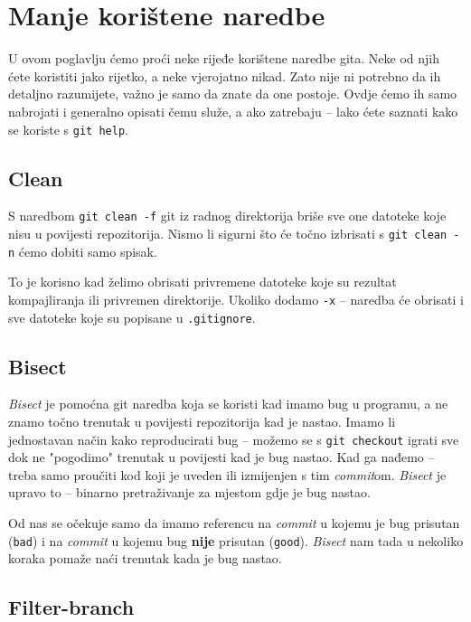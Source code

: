 \chapter*{Manje korištene naredbe}

U ovom poglavlju ćemo proći neke rijeđe korištene naredbe gita.
Neke od njih ćete koristiti jako rijetko, a neke vjerojatno nikad.
Zato nije ni potrebno da ih detaljno razumijete, važno je samo da znate da one postoje. 
Ovdje ćemo ih samo nabrojati i generalno opisati čemu služe, a ako zatrebaju -- lako ćete saznati kako se koriste s \verb+git help+.

\section*{Clean}

S naredbom \verb+git clean -f+ git iz radnog direktorija briše sve one datoteke koje nisu u povijesti repozitorija.
Nismo li sigurni što će točno izbrisati s \verb+git clean -n+ ćemo dobiti samo spisak.

To je korisno kad želimo obrisati privremene datoteke koje su rezultat kompajliranja ili privremen direktorije.
Ukoliko dodamo \verb+-x+ -- naredba će obrisati i sve datoteke koje su popisane u \verb+.gitignore+.

\section*{Bisect}

\emph{Bisect} je pomoćna git naredba koja se koristi kad imamo bug u programu, a ne znamo točno trenutak u povijesti repozitorija kad je nastao.
Imamo li jednostavan način kako reproducirati bug -- možemo se s \verb+git checkout+ igrati sve dok ne "pogodimo" trenutak u povijesti kad je bug nastao. 
Kad ga nađemo -- treba samo proučiti kod koji je uveden ili izmijenjen s tim \emph{commit}om.
\emph{Bisect} je upravo to -- binarno pretraživanje za mjestom gdje je bug nastao.

Od nas se očekuje samo da imamo referencu na \emph{commit} u kojemu je bug prisutan (\verb+bad+) i na \emph{commit} u kojemu bug \textbf{nije} prisutan (\verb+good+).
\emph{Bisect} nam tada u nekoliko koraka pomaže naći trenutak kada je bug nastao.

\section*{Filter-branch}

